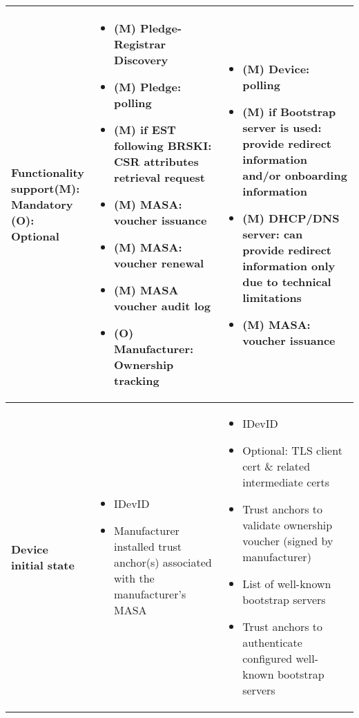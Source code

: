\begin{longtable}{|p{0.23\linewidth}|p{0.372\linewidth}|p{0.393\linewidth}|}
		\hline
		\cellcolor[rgb]{ .745,  .804,  .843}\textbf{Functionality support\newline{}(M): Mandatory\newline{}	(O): Optional} 
			&   
			\begin{itemize}[leftmargin=*,topsep=0pt, noitemsep]
			\item
				(M) Pledge-Registrar Discovery
			\item
				(M) Pledge: polling
			\item
				(M) if EST following BRSKI: CSR attributes retrieval request
			\item
				(M) MASA: voucher issuance
			\item
				(M) MASA: voucher renewal
			\item
				(M) MASA voucher audit log
			\item
				(O) Manufacturer: Ownership tracking
			\end{itemize}
		
		& 
			\begin{itemize}[leftmargin=*, topsep=0pt, noitemsep]
			\item
			(M) Device: polling
			\item
			(M) if Bootstrap server is used: provide redirect information and/or onboarding information
			\item
			(M) DHCP/DNS server: can provide redirect information only due to technical limitations
			\item
			(M) MASA: voucher issuance
			\end{itemize}
		 \\

		\hline
		\cellcolor[rgb]{ .745,  .804,  .843} \textbf{Device initial state} &  
			\begin{itemize}[leftmargin=*, topsep=0pt, noitemsep]
			\item
			IDevID
			\item
			Manufacturer installed trust anchor(s) associated with the manufacturer's MASA
			\end{itemize}
		 &  
			\begin{itemize}[leftmargin=*, topsep=0pt, noitemsep]
			\item
			 IDevID
			\item
			 Optional:
			 TLS client cert \& related intermediate certs 
			\item
			 Trust anchors to validate ownership voucher (signed by manufacturer)
			\item
			 List of well-known bootstrap servers 
			\item
			 Trust anchors to authenticate configured well-known bootstrap servers
			\end{itemize}
		  \\


\end{longtable}
